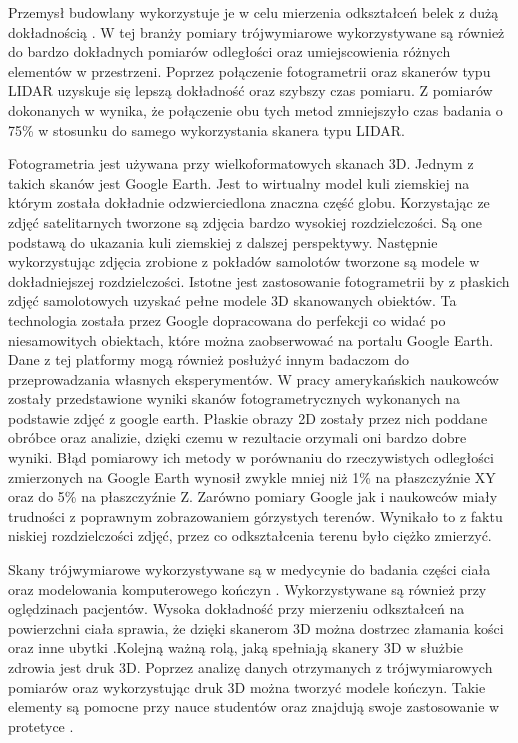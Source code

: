 \documentclass{pginz}
\begin{document}
Przemysł budowlany wykorzystuje je w celu mierzenia odkształceń belek z dużą dokładnością \cite{goszczynska2014doswiadczalna}. W tej branży pomiary trójwymiarowe wykorzystywane są również do bardzo dokładnych pomiarów odległości oraz umiejscowienia różnych elementów w przestrzeni. Poprzez połączenie fotogrametrii oraz skanerów typu LIDAR uzyskuje się lepszą dokładność oraz szybszy czas pomiaru. Z pomiarów dokonanych w \cite{el2008integrating} wynika, że połączenie obu tych metod zmniejszyło czas badania o 75\% w stosunku do samego wykorzystania skanera typu LIDAR.

Fotogrametria jest używana przy wielkoformatowych skanach 3D. Jednym z takich skanów jest Google Earth. Jest to wirtualny model kuli ziemskiej na którym została dokładnie odzwierciedlona znaczna część globu. Korzystając ze zdjęć satelitarnych tworzone są zdjęcia bardzo wysokiej rozdzielczości. Są one podstawą do ukazania kuli ziemskiej z dalszej perspektywy. Następnie wykorzystując zdjęcia zrobione z pokładów samolotów tworzone są modele w dokładniejszej rozdzielczości. Istotne jest zastosowanie fotogrametrii by z płaskich zdjęć samolotowych uzyskać pełne modele 3D skanowanych obiektów. Ta technologia została przez Google dopracowana do perfekcji co widać po niesamowitych obiektach, które można zaobserwować na portalu Google Earth. Dane z tej platformy mogą również posłużyć innym badaczom do przeprowadzania własnych eksperymentów. W pracy amerykańskich naukowców \cite{inproceedings} zostały przedstawione wyniki skanów fotogrametrycznych wykonanych na podstawie zdjęć z google earth. Płaskie obrazy 2D zostały przez nich poddane obróbce oraz analizie, dzięki czemu w rezultacie orzymali oni bardzo dobre wyniki. Błąd pomiarowy ich metody w porównaniu do rzeczywistych odległości zmierzonych na Google Earth wynosił zwykle mniej niż 1\% na płaszczyźnie XY oraz do 5\% na płaszczyźnie Z. Zarówno pomiary Google jak i naukowców miały trudności z poprawnym zobrazowaniem górzystych terenów. Wynikało to z faktu niskiej rozdzielczości zdjęć, przez co odkształcenia terenu było ciężko zmierzyć.

Skany trójwymiarowe wykorzystywane są w medycynie do badania części ciała oraz modelowania komputerowego kończyn \cite{tomaka20053d}. Wykorzystywane są również przy oględzinach pacjentów. Wysoka dokładność przy mierzeniu odkształceń na powierzchni ciała sprawia, że dzięki skanerom 3D można dostrzec złamania kości oraz inne ubytki \cite{thali2003optical}.Kolejną ważną rolą, jaką spełniają skanery 3D w służbie zdrowia jest druk 3D. Poprzez analizę danych otrzymanych z trójwymiarowych pomiarów oraz wykorzystując druk 3D można tworzyć modele kończyn. Takie elementy są pomocne przy nauce studentów oraz znajdują swoje zastosowanie w protetyce \cite{mcmenamin2014production}. 
\end{document}
